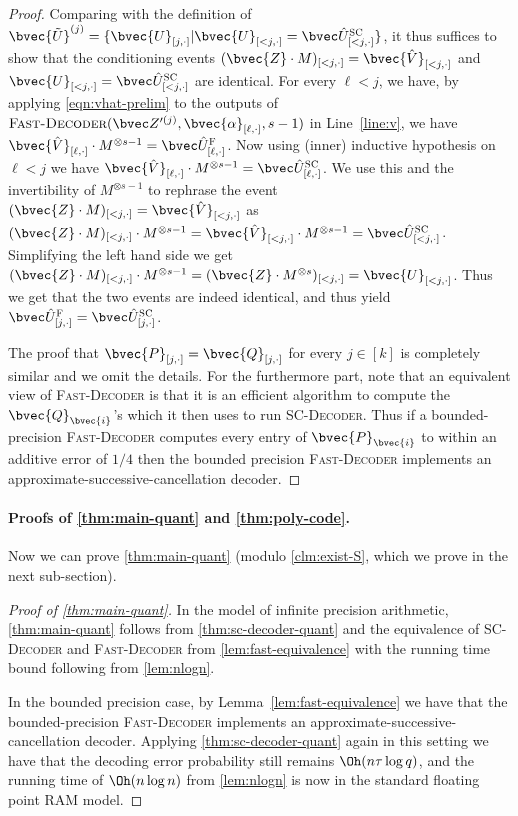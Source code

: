 \documentclass[11pt]{article}
\begin{document}
\begin{proof}
	Comparing with the definition of $\bvec{\tilde{U}}^{(j)} = \{\bvec{U}_{[j,\cdot]} | \bvec{U}_{[<j,\cdot]} = \USC_{[<j,\cdot]}\}$, it thus suffices to show that the conditioning events 
	$(\bvec{Z}\cdot M)_{[<j,\cdot]} = \bvec{\hat V}_{[<j,\cdot]}$
	and $\bvec{U}_{[<j,\cdot]} = \USC_{[<j,\cdot]}$ are identical. 
	For every $\ell < j$, we have, by applying \cref{eqn:vhat-prelim} to the outputs of $\textsc{Fast-Decoder}(\Zpj,\bvec{\alpha}_{[\ell,\cdot]},s-1)$ in Line~\ref{line:v}, we have $\bvec{\hat{V}}_{[\ell,\cdot]}\cdot M^{\otimes s-1} = \UF_{[\ell,\cdot]}$. Now using (inner) inductive hypothesis on $\ell < j$ we have $\bvec{\hat{V}}_{[\ell,\cdot]}\cdot M^{\otimes s-1} = \USC_{[\ell,\cdot]}$. We use this and the invertibility of $M^{\otimes s-1}$ to rephrase the event $(\bvec{Z}\cdot M)_{[<j,\cdot]} = \bvec{\hat V}_{[<j,\cdot]}$
	as 
	$(\bvec{Z}\cdot M)_{[<j,\cdot]}\cdot M^{\otimes s-1} =  \bvec{\hat V}_{[<j,\cdot]} \cdot M^{\otimes s-1} = \USC_{[<j,\cdot]}$. 
	Simplifying the left hand side we get $(\bvec{Z}\cdot M)_{[<j,\cdot]}\cdot M^{\otimes s-1} = (\bvec{Z}\cdot M^{\otimes s})_{[<j,\cdot]} = \bvec{U}_{[<j,\cdot]}$.
	Thus we get that the two events are indeed identical, and thus yield $\UF_{[j,\cdot]} = \USC_{[j,\cdot]}$.
	
	The proof that $\bvec{P}_{[j,\cdot]} = \bvec{Q}_{[j,\cdot]}$ for every $j \in [k]$ is completely similar and we omit the details. For the furthermore part, note that an equivalent view of \textsc{Fast-Decoder} is that it is an efficient algorithm to compute the $\bvec{Q}_{\bvec{i}}$'s which it then uses to run \textsc{SC-Decoder}. Thus if a bounded-precision \textsc{Fast-Decoder} computes every entry of $\bvec{P}_{\bvec{i}}$ to within an additive error of $1/4$ then the bounded precision \textsc{Fast-Decoder} implements an approximate-successive-cancellation decoder.
\end{proof}

\paragraph{Proofs of \cref{thm:main-quant} and \cref{thm:poly-code}.}
Now we can prove \cref{thm:main-quant} (modulo \cref{clm:exist-S}, which we prove in the next sub-section).
\begin{proof}[Proof of \cref{thm:main-quant}]
	In the model of infinite precision arithmetic, \cref{thm:main-quant} follows from 
	\cref{thm:sc-decoder-quant} and the equivalence of \textsc{SC-Decoder} and \textsc{Fast-Decoder} from \cref{lem:fast-equivalence}
	with the running time bound following from \cref{lem:nlogn}. 
	
	In the bounded precision case, by Lemma~\ref{lem:fast-equivalence} we have that the bounded-precision \textsc{Fast-Decoder} implements an approximate-successive-cancellation decoder. Applying \cref{thm:sc-decoder-quant} again in this setting we have that the decoding error probability still remains $\Oh(n \tau \log q)$, and the running time of $\Oh(n \log n)$ from \cref{lem:nlogn} is now in the standard floating point RAM model.
\end{proof}
\end{document}
